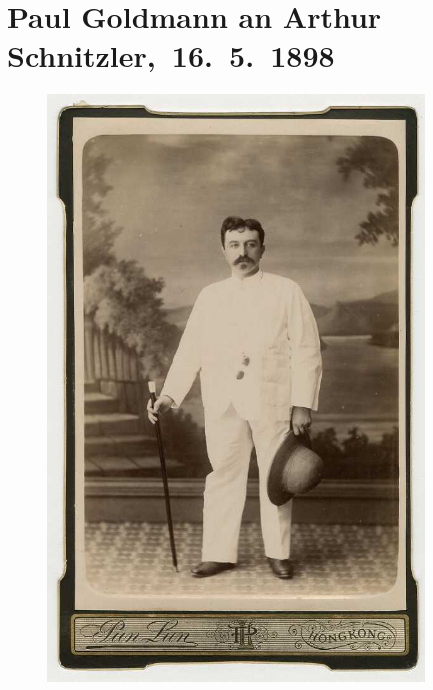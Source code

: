 

         
         \renewcommand{\erwaehntePersonen}{Personen:  ?? [Chinesischer Fotograf], Richard Beer-Hofmann, Louis Philipp Friedmann, Rose Friedmann, Paul Goldmann, Hugo von Hofmannsthal, Marie Reinhard, Arthur Rosthorn, Leo Van-Jung, Alice Ziegler}
         \renewcommand{\erwaehnteInstitutionen}{Institutionen: Pun lun}
         \renewcommand{\erwaehnteOrte}{Orte: Bad Gastein, China, Deutsches Postamt in Shanghai, Deutschland, Europa, Graz, Guangzhou, Hong Kong, Hongkong Hotel, Italien, München, Peking, Prag, Salzburg, Schweiz, Shanghai, Tegernsee, Wien}
         \renewcommand{\erwaehnteWerke}{Werke: Paul Goldmann, Tagebuch}
               \section[ Paul Goldmann an Arthur Schnitzler, 16. 5. 1898]{ Paul Goldmann an Arthur Schnitzler, 16. 5. 1898}\nopagebreak{}\rehead{ }\begin{ledgroupsized}[t]{13cm}\normalsize\beginnumbering{} \toendnotes[C]{\smallbreak\pagebreak[2]} 
\toendnotes[C]{\smallbreak}\begin{figure}[H]\centering\includegraphics[width=10cm]{../tex-inputs/img/img6272-46.jpg}\end{figure}\pstart

\end{ledgroupsized}
